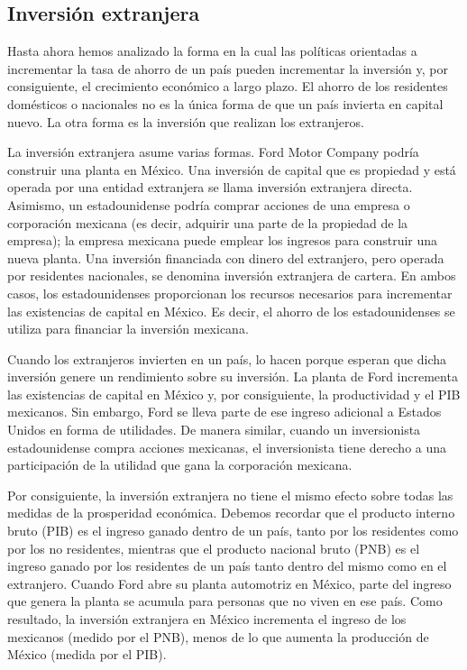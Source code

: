 \documentclass[
]{krantz}
\begin{document}
\hypertarget{inversiuxf3n-extranjera}{%
\subsection{Inversión extranjera}\label{inversiuxf3n-extranjera}}

Hasta ahora hemos analizado la forma en la cual las políticas orientadas a incrementar la tasa de ahorro de un país pueden incrementar la inversión y, por consiguiente, el crecimiento económico a largo plazo. El ahorro de los residentes domésticos o nacionales no es la única forma de que un país invierta en capital nuevo. La otra forma es la inversión que realizan los extranjeros.

La inversión extranjera asume varias formas. Ford Motor Company podría construir una planta en México. Una inversión de capital que es propiedad y está operada por una entidad extranjera se llama inversión extranjera directa. Asimismo, un estadounidense podría comprar acciones de una empresa o corporación mexicana (es decir, adquirir una parte de la propiedad de la empresa); la empresa mexicana puede emplear los ingresos para construir una nueva planta. Una inversión financiada con dinero del extranjero, pero operada por residentes nacionales, se denomina inversión extranjera de cartera. En ambos casos, los estadounidenses proporcionan los recursos necesarios para incrementar las existencias de capital en México. Es decir, el ahorro de los estadounidenses se utiliza para financiar la inversión mexicana.

Cuando los extranjeros invierten en un país, lo hacen porque esperan que dicha inversión genere un rendimiento sobre su inversión. La planta de Ford incrementa las existencias de capital en México y, por consiguiente, la productividad y el PIB mexicanos. Sin embargo, Ford se lleva parte de ese ingreso adicional a Estados Unidos en forma de utilidades. De manera similar, cuando un inversionista estadounidense compra acciones mexicanas, el inversionista tiene derecho a una participación de la utilidad que gana la corporación mexicana.

Por consiguiente, la inversión extranjera no tiene el mismo efecto sobre todas las medidas de la prosperidad económica. Debemos recordar que el producto interno bruto (PIB) es el ingreso ganado dentro de un país, tanto por los residentes como por los no residentes, mientras que el producto nacional bruto (PNB) es el ingreso ganado por los residentes de un país tanto dentro del mismo como en el extranjero. Cuando Ford abre su planta automotriz en México, parte del ingreso que genera la planta se acumula para personas que no viven en ese país. Como resultado, la inversión extranjera en México incrementa el ingreso de los mexicanos (medido por el PNB), menos de lo que aumenta la producción de México (medida por el PIB).
\end{document}
